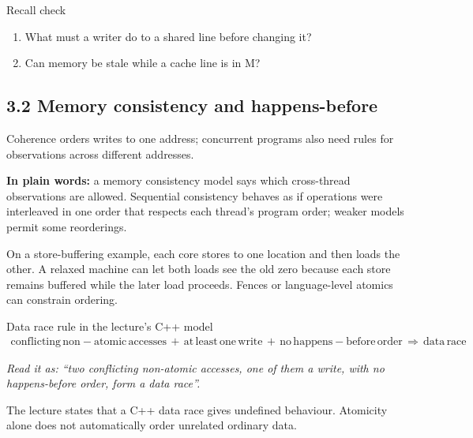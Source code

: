 \documentclass[11pt]{article}
\begin{document}
\begin{keepsection}
\begin{recallbox}{Recall check}
\begin{enumerate}
\item What must a writer do to a shared line before changing it?
\item Can memory be stale while a cache line is in M?
\end{enumerate}

\end{recallbox}
\end{keepsection}

\begin{keepsection}
\section{3.2 Memory consistency and happens-before}

Coherence orders writes to one address; concurrent programs also need rules for observations across different addresses.

\begin{plainbox}\textbf{In plain words:} a memory consistency model says which cross-thread observations are allowed. Sequential consistency behaves as if operations were interleaved in one order that respects each thread’s program order; weaker models permit some reorderings.\end{plainbox}

On a store-buffering example, each core stores to one location and then loads the other. A relaxed machine can let both loads see the old zero because each store remains buffered while the later load proceeds. Fences or language-level atomics can constrain ordering.

\begin{equationcard}{Data race rule in the lecture’s C++ model}
\[ \begin{gathered} \text{conflicting}\, \text{non}-\text{atomic}\, \text{accesses}\, +\, \text{at}\, \text{least}\, \text{one}\, \text{write}\, +\, \text{no}\, \text{happens}-\text{before}\, \text{order}\, \Rightarrow \, \text{data}\, \text{race} \end{gathered} \]
{\small \emph{Read it as: “two conflicting non-atomic accesses, one of them a write, with no happens-before order, form a data race”.}\par The lecture states that a C++ data race gives undefined behaviour. Atomicity alone does not automatically order unrelated ordinary data.}
\end{equationcard}


\end{keepsection}
\end{document}
